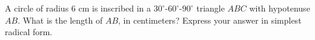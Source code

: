 A circle of radius $6$ cm is inscribed in a $30^\circ$-$60^\circ$-$90^\circ$ triangle $ABC$ with hypotenuse $AB$. What is the length of $AB$, in centimeters? Express your answer in simplest radical form.
